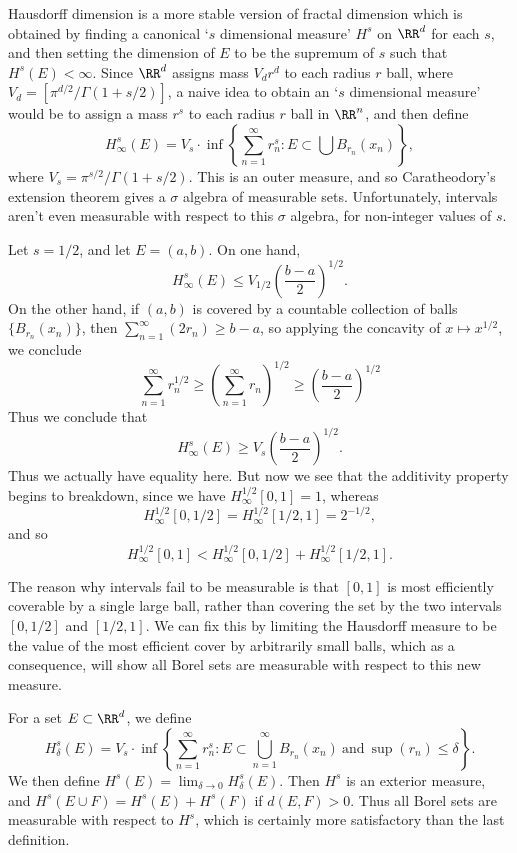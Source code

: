 Hausdorff dimension is a more stable version of fractal dimension which is obtained by finding a canonical `$s$ dimensional measure' $H^s$ on $\RR^d$ for each $s$, and then setting the dimension of $E$ to be the supremum of $s$ such that $H^s(E) < \infty$. Since $\RR^d$ assigns mass $V_d r^d$ to each radius $r$ ball, where $V_d = [\pi^{d/2}/\Gamma(1+s/2)]$, a naive idea to obtain an `$s$ dimensional measure' would be to assign a mass $r^s$ to each radius $r$ ball in $\RR^n$, and then define
%
\[ H^s_\infty(E) = V_s \cdot \inf \left\{ \sum_{n = 1}^\infty r_n^s : E \subset \bigcup B_{r_n}(x_n) \right\}, \]
%
where $V_s = \pi^{s/2} / \Gamma(1 + s/2)$. This is an outer measure, and so Caratheodory's extension theorem gives a $\sigma$ algebra of measurable sets. Unfortunately, intervals aren't even measurable with respect to this $\sigma$ algebra, for non-integer values of $s$.

\begin{example}
	Let $s = 1/2$, and let $E = (a,b)$. On one hand,
	\[ H^s_\infty(E) \leq V_{1/2} \left( \frac{b-a}{2} \right)^{1/2}. \]
	On the other hand, if $(a,b)$ is covered by a countable collection of balls $\{ B_{r_n}(x_n) \}$, then $\sum_{n = 1}^\infty (2r_n) \geq b - a$, so applying the concavity of $x \mapsto x^{1/2}$, we conclude
	\[ \sum_{n = 1}^\infty r_n^{1/2} \geq \left( \sum_{n = 1}^\infty r_n \right)^{1/2} \geq \left( \frac{b - a}{2} \right)^{1/2} \]
	Thus we conclude that
	\[ H^s_\infty(E) \geq V_s \left( \frac{b-a}{2} \right)^{1/2}. \]
	Thus we actually have equality here. But now we see that the additivity property begins to breakdown, since we have $H^{1/2}_\infty[0,1] = 1$, whereas
	\[ H^{1/2}_\infty[0,1/2] = H^{1/2}_\infty[1/2,1] = 2^{-1/2}, \]
	and so
	\[ H^{1/2}_\infty[0,1] < H^{1/2}_\infty[0,1/2] + H^{1/2}_\infty[1/2,1]. \]
\end{example}

The reason why intervals fail to be measurable is that $[0,1]$ is most efficiently coverable by a single large ball, rather than covering the set by the two intervals $[0,1/2]$ and $[1/2,1]$. We can fix this by limiting the Hausdorff measure to be the value of the most efficient cover by arbitrarily small balls, which as a consequence, will show all Borel sets are measurable with respect to this new measure.

For a set $E \subset \RR^d$, we define
%
\[ H_\delta^s(E) = V_s \cdot \inf \left\{ \sum_{n = 1}^\infty r_n^s : E \subset \bigcup_{n = 1}^\infty B_{r_n}(x_n)\ \text{and}\ \sup(r_n) \leq \delta \right\}. \]
%
We then define $H^s(E) = \lim_{\delta \to 0} H_\delta^s(E)$. Then $H^s$ is an exterior measure, and $H^s(E \cup F) = H^s(E) + H^s(F)$ if $d(E,F) > 0$. Thus all Borel sets are measurable with respect to $H^s$, which is certainly more satisfactory than the last definition.

